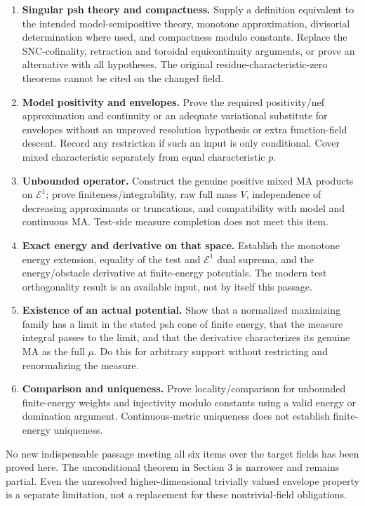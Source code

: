 \documentclass[
  11pt,
]{article}
\providecommand{\tightlist}{%
  \setlength{\itemsep}{0pt}\setlength{\parskip}{0pt}}
\begin{document}
\begin{enumerate}
\def\labelenumi{\arabic{enumi}.}
\tightlist
\item
  \textbf{Singular psh theory and compactness.} Supply a definition
  equivalent to the intended model-semipositive theory, monotone
  approximation, divisorial determination where used, and compactness
  modulo constants. Replace the SNC-cofinality, retraction and toroidal
  equicontinuity arguments, or prove an alternative with all hypotheses.
  The original residue-characteristic-zero theorems cannot be cited on
  the changed field.
\item
  \textbf{Model positivity and envelopes.} Prove the required
  positivity/nef approximation and continuity or an adequate variational
  substitute for envelopes without an unproved resolution hypothesis or
  extra function-field descent. Record any restriction if such an input
  is only conditional. Cover mixed characteristic separately from equal
  characteristic \(p\).
\item
  \textbf{Unbounded operator.} Construct the genuine positive mixed MA
  products on \(\mathcal E^1\); prove finiteness/integrability, raw full
  mass \(V\), independence of decreasing approximants or truncations,
  and compatibility with model and continuous MA. Test-side measure
  completion does not meet this item.
\item
  \textbf{Exact energy and derivative on that space.} Establish the
  monotone energy extension, equality of the test and \(\mathcal E^1\)
  dual suprema, and the energy/obstacle derivative at finite-energy
  potentials. The modern test orthogonality result is an available
  input, not by itself this passage.
\item
  \textbf{Existence of an actual potential.} Show that a normalized
  maximizing family has a limit in the stated psh cone of finite energy,
  that the measure integral passes to the limit, and that the derivative
  characterizes its genuine MA as the full \(\mu\). Do this for
  arbitrary support without restricting and renormalizing the measure.
\item
  \textbf{Comparison and uniqueness.} Prove locality/comparison for
  unbounded finite-energy weights and injectivity modulo constants using
  a valid energy or domination argument. Continuous-metric uniqueness
  does not establish finite-energy uniqueness.
\end{enumerate}

No new indispensable passage meeting all six items over the target
fields has been proved here. The unconditional theorem in Section 3 is
narrower and remains partial. Even the unresolved higher-dimensional
trivially valued envelope property is a separate limitation, not a
replacement for these nontrivial-field obligations.
\end{document}
